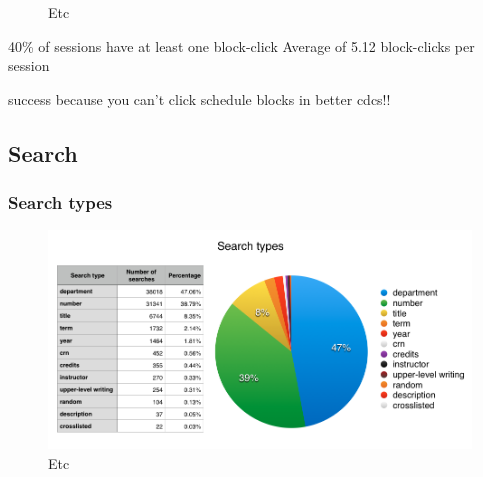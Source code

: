 \begin{figure}
  \centering


  \caption{Etc}
  \label{fig:searchtypes}

\end{figure}

40\% of sessions have at least one block-click
Average of 5.12 block-clicks per session

success because you can't click schedule blocks in better cdcs!!

\subsection{Search}

  \subsubsection{Search types}

  \begin{figure}
    \centering
    \includegraphics[width=1.0\textwidth]{images/graph/searchtypes}

    \caption{Etc}
    \label{fig:searchtypes}

  \end{figure}

